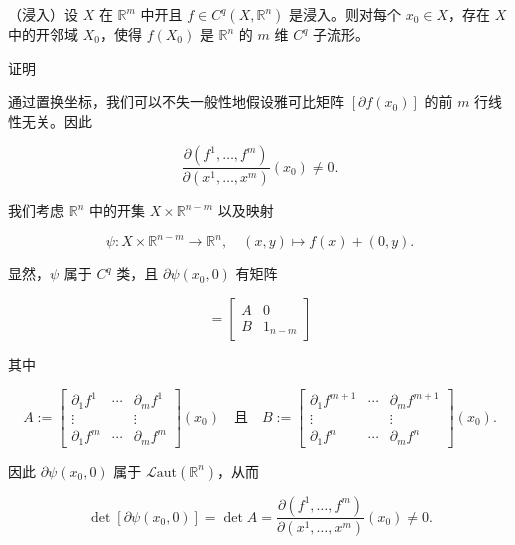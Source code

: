 \begin{theorem}

（浸入）设 $ X $ 在 $ \mathbb{R}^{m} $ 中开且 $ f \in C^{q}(X, \mathbb{R}^{n}) $ 是浸入。则对每个 $ x_{0} \in X $，存在 $ X $ 中的开邻域 $ X_{0} $，使得 $ f(X_{0}) $ 是 $ \mathbb{R}^{n} $ 的 $ m $ 维 $ C^{q} $ 子流形。

证明

\begin{subitems}
\item

通过置换坐标，我们可以不失一般性地假设雅可比矩阵 $ [\partial f(x_{0})] $ 的前 $ m $ 行线性无关。因此

\[
\frac{\partial(f^{1}, \ldots, f^{m})}{\partial(x^{1}, \ldots, x^{m})}(x_{0}) \ne 0 .
\]
\item

我们考虑 $ \mathbb{R}^{n} $ 中的开集 $ X \times \mathbb{R}^{n-m} $ 以及映射

\[
\psi : X \times \mathbb{R}^{n-m} \to \mathbb{R}^{n} , \quad (x, y) \mapsto f(x) + (0, y) .
\]

显然，$ \psi $ 属于 $ C^{q} $ 类，且 $ \partial\psi(x_{0}, 0) $ 有矩阵

\begin{equation*}
[\partial\psi(x_{0}, 0)] = \begin{bmatrix} A & 0 \\ B & 1_{n-m} \end{bmatrix}
\end{equation*}

其中

\begin{equation*}
A := \begin{bmatrix} \partial_{1}f^{1} & \cdots & \partial_{m}f^{1} \\ \vdots & & \vdots \\ \partial_{1}f^{m} & \cdots & \partial_{m}f^{m} \end{bmatrix}(x_{0}) \quad \text{且} \quad B := \begin{bmatrix} \partial_{1}f^{m+1} & \cdots & \partial_{m}f^{m+1} \\ \vdots & & \vdots \\ \partial_{1}f^{n} & \cdots & \partial_{m}f^{n} \end{bmatrix}(x_{0}) .
\end{equation*}

因此 $ \partial\psi(x_{0}, 0) $ 属于 $ \mathcal{L}\mathrm{aut}(\mathbb{R}^{n}) $，从而

\[
\det[\partial\psi(x_{0}, 0)] = \det A = \frac{\partial(f^{1}, \ldots, f^{m})}{\partial(x^{1}, \ldots, x^{m})}(x_{0}) \ne 0 .
\]


\end{subitems}
\end{theorem}

